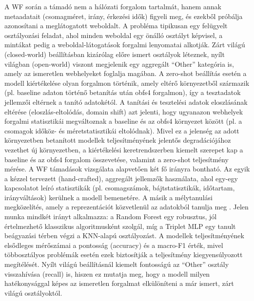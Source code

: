 \documentclass[a4paper,oneside]{article}
\begin{document}
A WF során a támadó nem a hálózati forgalom tartalmát, hanem annak metaadatait (csomagméret, irány, érkezési idők) figyeli meg, és ezekből próbálja azonosítani a meglátogatott weboldalt.
A probléma tipikusan egy felügyelt osztályozási feladat, ahol minden weboldal egy önálló osztályt képvisel, a mintákat pedig a weboldal-látogatások forgalmi lenyomatai alkotják.
Zárt világú (closed-world) beállításban kizárólag előre ismert osztályok léteznek, nyílt világban (open-world) viszont megjelenik egy aggregált ``Other'' kategória is, amely az ismeretlen webhelyeket foglalja magában.
A zero-shot beállítás esetén a modell kiértékelése olyan forgalmon történik, amely eltérő környezetből származik (pl. baseline adaton történő betanítás után obfs4 forgalmon), így a tesztadatok jellemzői eltérnek a tanító adatokétól.
A tanítási és tesztelési adatok eloszlásának eltérése (eloszlás-eltolódás, domain shift) azt jelenti, hogy ugyanazon webhelyek forgalmi statisztikái megváltoznak a baseline és az obfs4 környezet között (pl. a csomagok időköz- és méretstatisztikái eltolódnak).
Mivel ez a jelenség az adott környezetben betanított modellek teljesítményének jelentős degradációjához vezethet új környezetben, a kiértékelési keretrendszerben kiemelt szerepet kap a baseline és az obfs4 forgalom összevetése, valamint a zero-shot teljesítmény mérése.
A WF támadások vizsgálata alapvetően két fő irányra bontható. Az egyik a kézzel tervezett (hand-crafted), aggregált jellemzők használata, ahol egy-egy kapcsolatot leíró statisztikák (pl. csomagszámok, bájtstatisztikák, időtartam, irányváltások) kerülnek a modell bemenetére.
A másik a mélytanulási megközelítés, amely a reprezentációt közvetlenül az adatokból tanulja meg \cite{sirinam2018}.
Jelen munka mindkét irányt alkalmazza: a Random Forest egy robusztus, jól értelmezhető klasszikus algoritmusként szolgál, míg a Triplet MLP egy tanult beágyazási térben végzi a KNN-alapú osztályozást.
A modellek teljesítményének elsődleges mérőszámai a pontosság (accuracy) és a macro-F1 érték, mivel többosztályos problémák esetén ezek biztosítják a teljesítmény kiegyensúlyozott megítélését.
Nyílt világú beállításnál kiemelt fontosságú az ``Other'' osztály visszahívása (recall) is, hiszen ez mutatja meg, hogy a modell milyen hatékonysággal képes az ismeretlen forgalmat elkülöníteni a már ismert, zárt világú osztályoktól.
\end{document}
